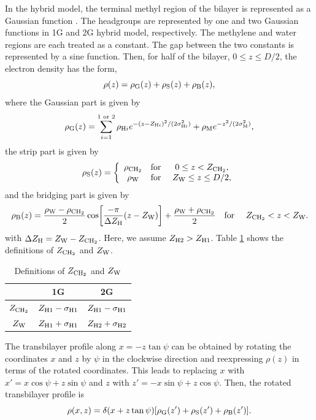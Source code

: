 In the hybrid model, the terminal methyl region of the bilayer is represented
as a Gaussian function \cite{ref:Wiener89}. The headgroups are represented by one 
and two Gaussian
functions in 1G and 2G hybrid model, respectively. The methylene and water 
regions are each treated as a constant. The gap between the two constants is 
represented by a sine function. Then, for half of the bilayer, 
$0 \leq z \leq D/2$, the electron density has the form, 
\begin{equation}
  \rho(z) = \rho_\mathrm{G}(z) + \rho_\mathrm{S}(z) + \rho_\mathrm{B}(z),
\end{equation}
where the Gaussian part is given by 
\begin{equation}
  \rho_\mathrm{G}(z) = \sum_{i=1}^{1\text{ or }2} \rho_{\mathrm{H}i}
             e^{-(z-Z_{\mathrm{H}i})^2/(2\sigma_{\mathrm{H}i}^2)} + \rho_\mathrm{M} e^{-z^2/(2\sigma_\mathrm{M}^2)},
\end{equation}
the strip part is given by
\begin{equation}
  \rho_\mathrm{S}(z) = \left\{
    \begin{array}{ccc}
      \rho_\mathrm{CH_2} & \text{for } & 0 \leq z < Z_\mathrm{CH_2}, \\
      \rho_\mathrm{W}   & \text{for } & Z_\mathrm{W} \leq z \leq D/2,
    \end{array}
  \right.
\end{equation}
and the bridging part is given by
\begin{equation}
  \rho_\mathrm{B}(z) = \frac{\rho_\mathrm{W}-\rho_\mathrm{CH_2}}{2} \cos \mathopen{}\left[ 
    \frac{-\pi}{\Delta Z_\mathrm{H}}(z-Z_\mathrm{W}) \right]\mathclose{} + \frac{\rho_\mathrm{W}+\rho_\mathrm{CH_2}}{2} \\
  \text{\quad for \quad} Z_\mathrm{CH_2} < z < Z_\mathrm{W}.
\end{equation}
with $\Delta Z_\mathrm{H}=Z_\mathrm{W}-Z_\mathrm{CH_2}$. Here, we assume $Z_{\mathrm{H}2}>Z_{\mathrm{H}1}$. 
Table \ref{tab:zchtwozw} shows the definitions of $Z_\mathrm{CH_2}$ and $Z_\mathrm{W}$.

\begin{table}[htbp]
  \centering
  \begin{tabular}{c c c}
    \hline
     & 1G & 2G \\
    \hline
    $Z_\mathrm{CH_2}$ & $Z_{\mathrm{H}1}-\sigma_{\mathrm{H}1}$ & $Z_{\mathrm{H}1}-\sigma_{\mathrm{H}1}$ \\
    $Z_\mathrm{W}$ & $Z_{\mathrm{H}1}+\sigma_{\mathrm{H}1}$ & $Z_{\mathrm{H}2}+\sigma_{\mathrm{H}2}$ \\
    \hline  
  \end{tabular}
  \caption{Definitions of $Z_\mathrm{CH_2}$ and $Z_\mathrm{W}$}
  \label{tab:zchtwozw}
\end{table}

The transbilayer profile along $x=-z\tan\psi$ can be obtained by rotating
the coordinates $x$ and $z$ by $\psi$ in the clockwise direction and
reexpressing $\rho(z)$ in terms of the rotated coordinates. This leads
to replacing $x$ with $x'=x\cos\psi+z\sin\psi$ and
$z$ with $z'=-x\sin\psi+z\cos\psi$. Then, the rotated transbilayer profile is
\begin{equation}
  \rho(x,z) = \delta(x+z\tan\psi)\mathopen{}\left[ \rho_\mathrm{G}(z') + \rho_\mathrm{S}(z') + \rho_\mathrm{B}(z') \right]\mathclose{}.
  \label{eq:rotated_profile}
\end{equation}

